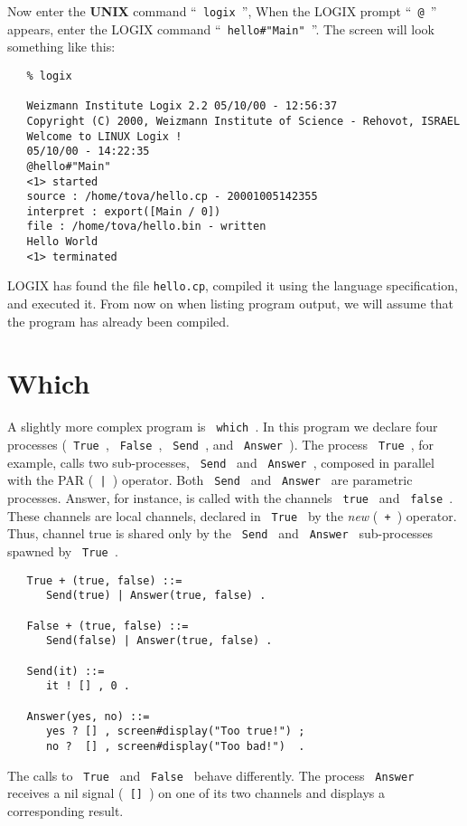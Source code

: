 Now enter the {\bf UNIX} command ``\verb+ logix +'',
When the LOGIX prompt ``\verb+ @ +'' appears,
enter the LOGIX command ``\verb+ hello#"Main" +''.  The screen will look
something like this:

\begin{verbatim}
   % logix

   Weizmann Institute Logix 2.2 05/10/00 - 12:56:37
   Copyright (C) 2000, Weizmann Institute of Science - Rehovot, ISRAEL
   Welcome to LINUX Logix !
   05/10/00 - 14:22:35
   @hello#"Main"
   <1> started
   source : /home/tova/hello.cp - 20001005142355
   interpret : export([Main / 0])
   file : /home/tova/hello.bin - written
   Hello World
   <1> terminated
\end{verbatim}

\noindent
LOGIX has found the file \verb+hello.cp+, compiled it using
the language specification, and executed it.  From now on when listing
program output, we will assume that the program has already been
compiled.

\section{Which}

A slightly more complex program is \verb+ which +. In this program we
declare four processes (\verb+ True +, \verb+ False +, \verb+ Send +, and
\verb+ Answer +).  The process \verb+ True +, for example, calls two
sub-processes, \verb+ Send + and \verb+ Answer +, composed in parallel
with the PAR (\verb+ | +) operator.  Both \verb+ Send + and
\verb+ Answer + are parametric processes. Answer, for instance, is 
called with the channels \verb+ true + and \verb+ false +.  These
channels are local channels, declared in \verb+ True + by
the {\em new} (\verb- + -) operator. Thus, channel true is shared only
by the \verb+ Send + and \verb+ Answer + sub-processes spawned by
\verb+ True +.

\begin{verbatim}
   True + (true, false) ::=
      Send(true) | Answer(true, false) .

   False + (true, false) ::=
      Send(false) | Answer(true, false) .

   Send(it) ::=
      it ! [] , 0 .

   Answer(yes, no) ::=
      yes ? [] , screen#display("Too true!") ;
      no ?  [] , screen#display("Too bad!")  .
\end{verbatim}

The calls to \verb+ True + and \verb+ False + behave differently.
The process \verb+ Answer + receives a nil signal (\verb+ [] +) on one
of its two channels and displays a corresponding result.


